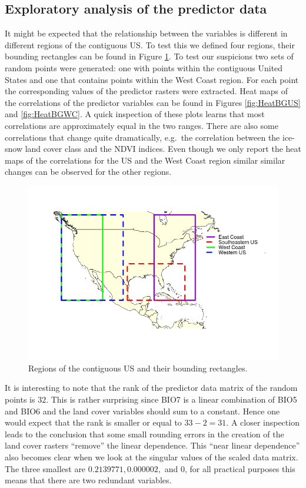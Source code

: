 \subsection{Exploratory analysis of the predictor data}
\label{sec:ExploratoryPredictor}
It might be expected that the relationship between the variables is different in different regions of the contiguous US. To test this we defined four regions, their bounding rectangles can be found in Figure \ref{fig:studyExtent}. To test our suspicions two sets of random points were generated: one with points within the contiguous United States and one that contains points within the West Coast region. For each point the corresponding values of the predictor rasters were extracted. Heat maps of the correlations of the predictor variables can be found in Figures \ref{fig:HeatBGUS} and \ref{fig:HeatBGWC}. A quick inspection of these plots learns that most correlations are approximately equal in the two ranges. There are also some correlations that change quite dramatically, e.g.\ the correlation between the ice-snow land cover class and the NDVI indices. Even though we only report the heat maps of the correlations for the US and the West Coast region similar similar changes can be observed for the other regions. \\

\begin{figure}[!htb]
\centering
\includegraphics[scale=0.6]{Plots/StudyExtent.png}
\caption{\label{fig:studyExtent}Regions of the contiguous US and their bounding rectangles.}
\end{figure}

It is interesting to note that the rank of the predictor data matrix of the random points is $32$. This is rather surprising since BIO7 is a linear combination of BIO5 and BIO6 and the land cover variables should sum to a constant. Hence one would expect that the rank is smaller or equal to $33-2 =31$. A closer inspection leads to the conclusion that some small rounding errors in the creation of the land cover rasters ``remove'' the linear dependence. This ``near linear dependence'' also becomes clear when we look at the singular values of the scaled data matrix. The three smallest are $0.2139771, 0.000002,$ and $0$, for all practical purposes this means that there are two redundant variables.\\


